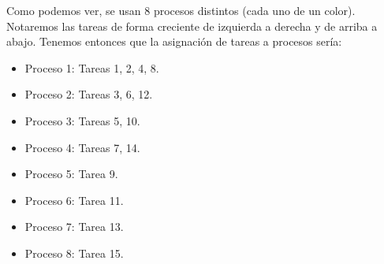 \begin{ejercicio}
\begin{enumerate}
        Como podemos ver, se usan 8 procesos distintos (cada uno de un color).
        Notaremos las tareas de forma creciente de izquierda a derecha y de arriba a abajo.
        Tenemos entonces que la asignación de tareas a procesos sería:
        \begin{itemize}
            \item \colorbox{red!60}{Proceso 1}: Tareas 1, 2, 4, 8.
            \item \colorbox{blue!60}{Proceso 2}: Tareas 3, 6, 12.
            \item \colorbox{teal!60}{Proceso 3}: Tareas 5, 10.
            \item \colorbox{green!60}{Proceso 4}: Tareas 7, 14.
            \item \colorbox{yellow!60}{Proceso 5}: Tarea 9.
            \item \colorbox{orange!60}{Proceso 6}: Tarea 11.
            \item \colorbox{purple!60}{Proceso 7}: Tarea 13.
            \item \colorbox{violet!60}{Proceso 8}: Tarea 15.
        \end{itemize}
        
        
    \end{enumerate}


\end{ejercicio}
